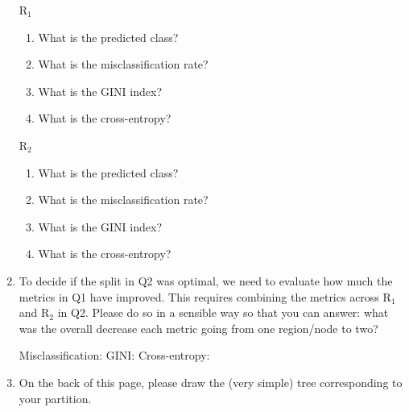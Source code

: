 \documentclass{article}\usepackage[]{graphicx}\usepackage[]{color}
\begin{document}
\begin{enumerate}
\vspace{5mm}

\begin{minipage}{.5\linewidth}
\begin{center}
$\textrm{R}_1$
\end{center}
\begin{enumerate}
\setlength\itemsep{3em}
\item What is the predicted class?
\item What is the misclassification rate?
\item What is the GINI index?
\item What is the cross-entropy?
\end{enumerate}
\end{minipage}
\begin{minipage}{.5\linewidth}
\begin{center}
$\textrm{R}_2$
\end{center}
\begin{enumerate}
\setlength\itemsep{3em}
\item What is the predicted class?
\item What is the misclassification rate?
\item What is the GINI index?
\item What is the cross-entropy?
\end{enumerate}

\end{minipage}
\item To decide if the split in Q2 was optimal, we need to evaluate how much the metrics in Q1 have improved. This requires combining the metrics across $\textrm{R}_1$ and $\textrm{R}_2$ in Q2. Please do so in a sensible way so that you can answer: what was the overall decrease each metric going from one region/node to two?

Misclassification: \hspace{30mm} GINI: \hspace{30mm} Cross-entropy:

\vspace{5mm}

\item On the back of this page, please draw the (very simple) tree corresponding to your partition.

\end{enumerate}
\end{document}
